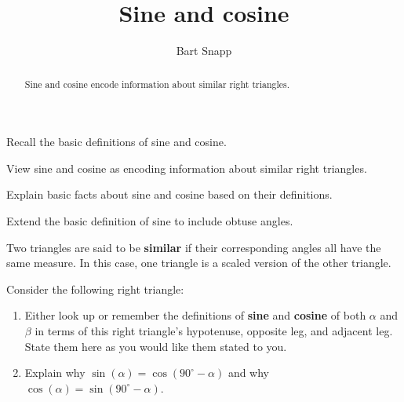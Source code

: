 \documentclass[noauthor,nooutcomes,hints,handout,12pt]{ximera}
\title{Sine and cosine}
\author{Bart Snapp}
\begin{document}
\begin{abstract}
  Sine and cosine encode information about similar right triangles.
\end{abstract}
\maketitle

\begin{listOutcomes}
\item Recall the basic definitions of sine and cosine.
\item View sine and cosine as encoding information about similar right
  triangles.
\item Explain basic facts about sine and cosine based on their
  definitions.
\item Extend the basic definition of sine to include obtuse angles. 
\end{listOutcomes}



\begin{definition}
 Two triangles are said to be \textbf{similar} if their corresponding angles all have the same measure.  In this case, one triangle is a scaled version of the other triangle.
\end{definition}


\mynewpage


\begin{question}
  Consider the following right triangle:
  \begin{center}
    \end{center}
  \begin{enumerate}
  \item Either look up or remember the definitions of \textbf{sine}
    and \textbf{cosine} of both $\alpha$ and $\beta$ in terms of this
    right triangle's hypotenuse, opposite leg, and adjacent leg. State them here as you would like them stated to you.  
    \item Explain why $\sin(\alpha) =
    \cos(90^\circ-\alpha)$ and why $\cos(\alpha) =
    \sin(90^\circ-\alpha)$.
\end{enumerate}
\end{question}
\mynewpage
\end{document}
